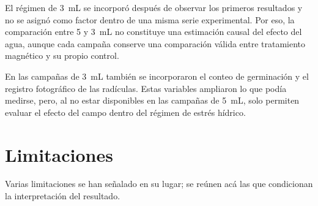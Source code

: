 El régimen de 3~mL se incorporó después de observar los primeros resultados y no se asignó como factor dentro de una misma serie experimental. Por eso, la comparación entre 5 y 3~mL no constituye una estimación causal del efecto del agua, aunque cada campaña conserve una comparación válida entre tratamiento magnético y su propio control.

En las campañas de 3~mL también se incorporaron el conteo de germinación y el registro fotográfico de las radículas. Estas variables ampliaron lo que podía medirse, pero, al no estar disponibles en las campañas de 5~mL, solo permiten evaluar el efecto del campo dentro del régimen de estrés hídrico.

\section{Limitaciones}
\label{sec:disc_limitaciones}

Varias limitaciones se han señalado en su lugar; se reúnen acá las que condicionan la interpretación del resultado.

